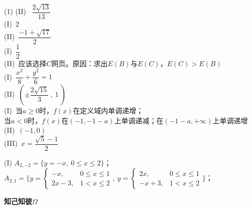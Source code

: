\documentclass[11pt,a4paper]{ctexart}
\newcounter{chapPage}
\begin{document}
    \begin{tasks}[label=(\arabic*), after-item-skip=0.6em,start=16] (1)
        \task 
        (II) \ $\dfrac{2 \sqrt{13}}{13}$ \\

        \task
        (I)\ $2$\\[0.6em]
        (II)\ $\dfrac{-1+\sqrt{17}}{2}$ \\

        \task
        (I)\ $\dfrac{1}{2}$ \\[0.6em]
        (II)\ 应该选择$C$网页。原因：求出$E(B)$与$E(C)$，$E(C)>E(B)$\\[0.6em]

        \task
        (I)\ $\dfrac{x^2}{8}+\dfrac{y^2}{6}= 1$ \\[0.6em]
        (II)\ $(\pm\dfrac{2\sqrt{15}}{3}\ ,\ 1\ )$\\
        
        \task
        (I)\ 当$a \ge 0$时，$f(x)$在定义域内单调递增；\\[0.6em]
        当$a<0$时，$f(x)$在$(-1,-1-a)$上单调递减；在$(-1-a,+ \infty)$上单调递增\\[0.6em]
        (II)\ $(-1,0)$\\[0.6em]
        (III)\ $x=\dfrac{\sqrt{5}-1}{2}$

        \task
        (I) $A_{2,-2}=\{y=-x,\ 0\le x\le 2\}$；\\
        $A_{2,1}=\big\{y= \begin{cases}
        -x, & 0\le x\le 1 \\
        2x-3, & 1<x\le 2
        \end{cases},\ y= \begin{cases}
        2x, & 0\le x\le 1 \\
        -x+3, & 1<x\le 2
        \end{cases}\big\}$；\\[0.6em]
    
    \end{tasks}
    
\newpage
{}
{} %
\setcounter{chapPage}{1} %

\begin{center}%
    {\LARGE \textbf{知己知彼$\Omega$}}\\[1em]
\end{center}
\end{document}
